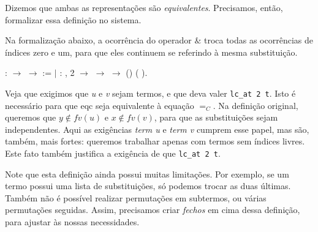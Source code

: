 Dizemos que ambas as representações são \emph{equivalentes}.  Precisamos, então,
formalizar essa definição no sistema.

Na formalização abaixo, a ocorrência do operador $\&$ troca todas as ocorrências
de índices zero e um, para que eles continuem se referindo à mesma substituição.

\bigskip
\coqdocnoindent
{}  :
 \ensuremath{\rightarrow} 
\ensuremath{\rightarrow}  := \coqdoceol \coqdocindent{1.00em}
\ensuremath{|} :
\coqdockw{\ensuremath{\forall}}   ,
 2  \ensuremath{\rightarrow}
  \ensuremath{\rightarrow}
  \ensuremath{\rightarrow}
(\coqdocnotation{[}\coqdocnotation{][}\coqdocnotation{]})
(\coqdocnotation{(}\coqdocnotation{\&}
\coqdocnotation{)[}\coqdocnotation{][}\coqdocnotation{]}).\coqdoceol
\bigskip


Veja que exigimos que \emph{u} e \emph{v} sejam termos, e que deva valer
\texttt{lc\_at 2 t}. Isto é necessário para que eqc seja equivalente à equação
$=_C$. Na definição original, queremos que $y \notin fv(u)$ e $x \notin fv(v)$,
para que as substituições sejam independentes. Aqui as exigências \emph{term u}
e \emph{term v} cumprem esse papel, mas são, também, mais fortes: queremos
trabalhar apenas com termos sem índices livres. Este fato também justifica a
exigência de que \texttt{lc\_at 2 t}.

Note que esta definição ainda possui muitas limitações. Por exemplo, se um termo
possui uma lista de substituições, só podemos trocar as duas últimas. Também não
é possível realizar permutações em subtermos, ou várias permutações seguidas.
Assim, precisamos criar \emph{fechos} em cima dessa definição, para ajustar às
nossas necessidades. 

